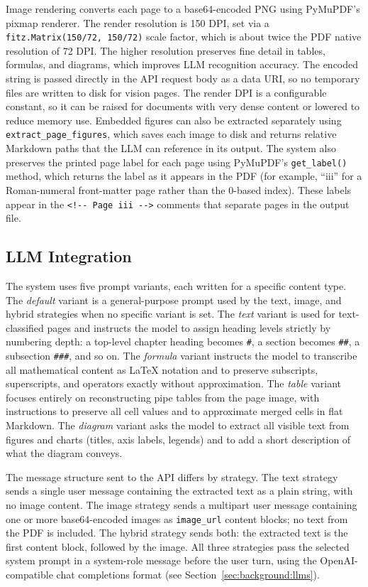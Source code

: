 \documentclass[12pt]{article}
\begin{document}
Image rendering converts each page to a base64-encoded PNG using PyMuPDF's pixmap renderer.
The render resolution is 150 DPI, set via a \texttt{fitz.Matrix(150/72,~150/72)} scale factor, which is about twice the PDF native resolution of 72 DPI.
The higher resolution preserves fine detail in tables, formulas, and diagrams, which improves LLM recognition accuracy.
The encoded string is passed directly in the API request body as a data URI, so no temporary files are written to disk for vision pages.
The render DPI is a configurable constant, so it can be raised for documents with very dense content or lowered to reduce memory use.
Embedded figures can also be extracted separately using \texttt{extract\_page\_figures}, which saves each image to disk and returns relative Markdown paths that the LLM can reference in its output.
The system also preserves the printed page label for each page using PyMuPDF's \texttt{get\_label()} method, which returns the label as it appears in the PDF (for example, ``iii'' for a Roman-numeral front-matter page rather than the 0-based index). These labels appear in the \texttt{<!{-}{-} Page iii -{-}>} comments that separate pages in the output file.

\subsection{LLM Integration}

The system uses five prompt variants, each written for a specific content type.
The \textit{default} variant is a general-purpose prompt used by the text, image, and hybrid strategies when no specific variant is set.
The \textit{text} variant is used for text-classified pages and instructs the model to assign heading levels strictly by numbering depth: a top-level chapter heading becomes \texttt{\#}, a section becomes \texttt{\#\#}, a subsection \texttt{\#\#\#}, and so on.
The \textit{formula} variant instructs the model to transcribe all mathematical content as \LaTeX{} notation and to preserve subscripts, superscripts, and operators exactly without approximation.
The \textit{table} variant focuses entirely on reconstructing pipe tables from the page image, with instructions to preserve all cell values and to approximate merged cells in flat Markdown.
The \textit{diagram} variant asks the model to extract all visible text from figures and charts (titles, axis labels, legends) and to add a short description of what the diagram conveys.

The message structure sent to the API differs by strategy.
The text strategy sends a single user message containing the extracted text as a plain string, with no image content.
The image strategy sends a multipart user message containing one or more base64-encoded images as \texttt{image\_url} content blocks; no text from the PDF is included.
The hybrid strategy sends both: the extracted text is the first content block, followed by the image.
All three strategies pass the selected system prompt in a system-role message before the user turn, using the OpenAI-compatible chat completions format (see Section~\ref{sec:background:llms}).
\end{document}
